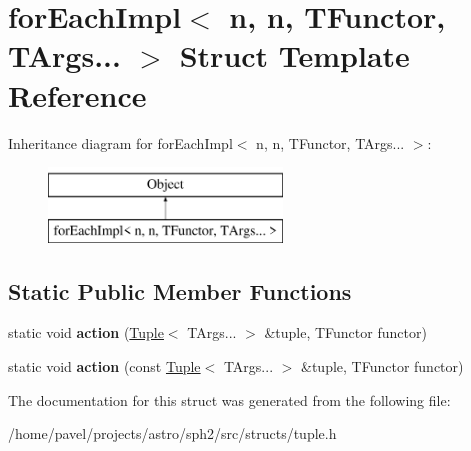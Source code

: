 \hypertarget{structforEachImpl_3_01n_00_01n_00_01TFunctor_00_01TArgs_8_8_8_01_4}{}\section{for\+Each\+Impl$<$ n, n, T\+Functor, T\+Args... $>$ Struct Template Reference}
\label{structforEachImpl_3_01n_00_01n_00_01TFunctor_00_01TArgs_8_8_8_01_4}
Inheritance diagram for for\+Each\+Impl$<$ n, n, T\+Functor, T\+Args... $>$\+:\begin{figure}[H]
\begin{center}
\leavevmode
\includegraphics[height=2.000000cm]{structforEachImpl_3_01n_00_01n_00_01TFunctor_00_01TArgs_8_8_8_01_4}
\end{center}
\end{figure}
\subsection*{Static Public Member Functions}
\begin{DoxyCompactItemize}
\item 
\hypertarget{structforEachImpl_3_01n_00_01n_00_01TFunctor_00_01TArgs_8_8_8_01_4_a2395d2d4580cb7c405535eab23cc2006}{}\label{structforEachImpl_3_01n_00_01n_00_01TFunctor_00_01TArgs_8_8_8_01_4_a2395d2d4580cb7c405535eab23cc2006} 
static void {\bfseries action} (\hyperlink{classTuple}{Tuple}$<$ T\+Args... $>$ \&tuple, T\+Functor functor)
\item 
\hypertarget{structforEachImpl_3_01n_00_01n_00_01TFunctor_00_01TArgs_8_8_8_01_4_aeda3f0b218679fc916334d6933b6db46}{}\label{structforEachImpl_3_01n_00_01n_00_01TFunctor_00_01TArgs_8_8_8_01_4_aeda3f0b218679fc916334d6933b6db46} 
static void {\bfseries action} (const \hyperlink{classTuple}{Tuple}$<$ T\+Args... $>$ \&tuple, T\+Functor functor)
\end{DoxyCompactItemize}


The documentation for this struct was generated from the following file\+:\begin{DoxyCompactItemize}
\item 
/home/pavel/projects/astro/sph2/src/structs/tuple.\+h\end{DoxyCompactItemize}
